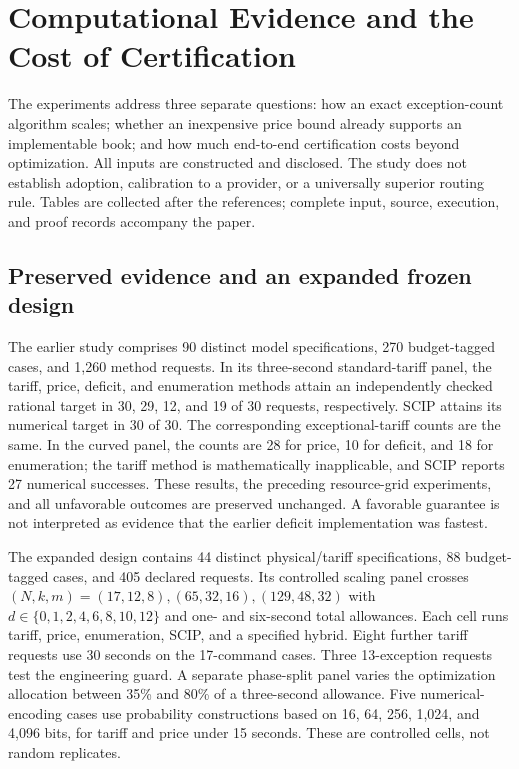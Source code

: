 \section{Computational Evidence and the Cost of Certification}\label{sec:study59}
The experiments address three separate questions: how an exact exception-count algorithm scales; whether an inexpensive price bound already supports an implementable book; and how much end-to-end certification costs beyond optimization. All inputs are constructed and disclosed. The study does not establish adoption, calibration to a provider, or a universally superior routing rule. Tables are collected after the references; complete input, source, execution, and proof records accompany the paper.

\subsection{Preserved evidence and an expanded frozen design}
The earlier study comprises 90 distinct model specifications, 270 budget-tagged cases, and 1,260 method requests. In its three-second standard-tariff panel, the tariff, price, deficit, and enumeration methods attain an independently checked rational target in 30, 29, 12, and 19 of 30 requests, respectively. SCIP attains its numerical target in 30 of 30. The corresponding exceptional-tariff counts are the same. In the curved panel, the counts are 28 for price, 10 for deficit, and 18 for enumeration; the tariff method is mathematically inapplicable, and SCIP reports 27 numerical successes. These results, the preceding resource-grid experiments, and all unfavorable outcomes are preserved unchanged. A favorable guarantee is not interpreted as evidence that the earlier deficit implementation was fastest.

The expanded design contains 44 distinct physical/tariff specifications, 88 budget-tagged cases, and 405 declared requests. Its controlled scaling panel crosses $(N,k,m)=(17,12,8),(65,32,16),(129,48,32)$ with $d\in\{0,1,2,4,6,8,10,12\}$ and one- and six-second total allowances. Each cell runs tariff, price, enumeration, SCIP, and a specified hybrid. Eight further tariff requests use 30 seconds on the 17-command cases. Three 13-exception requests test the engineering guard. A separate phase-split panel varies the optimization allocation between 35\% and 80\% of a three-second allowance. Five numerical-encoding cases use probability constructions based on 16, 64, 256, 1,024, and 4,096 bits, for tariff and price under 15 seconds. These are controlled cells, not random replicates.

